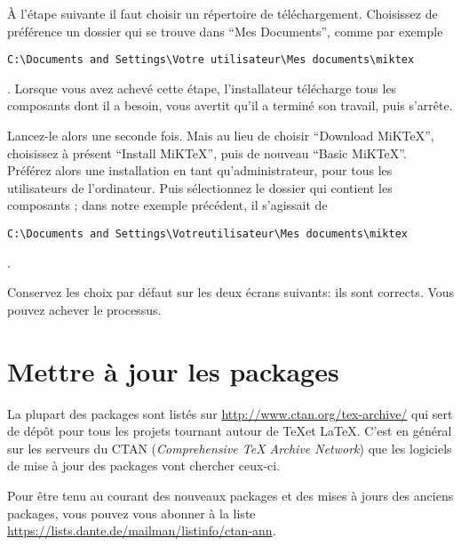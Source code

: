 À l'étape suivante il faut choisir un répertoire de téléchargement. Choisissez de préférence un dossier qui se trouve dans \enquote{Mes Documents}, comme par exemple \begin{english}\verb|C:\Documents and Settings\Votre utilisateur\Mes documents\miktex|\end{english}. Lorsque vous avez achevé cette étape, l'installateur télécharge tous les composants dont il a besoin, vous avertit qu'il a terminé son travail, puis s'arrête.

Lancez-le alors une seconde fois. Mais au lieu de choisir \enquote{Download MiKTeX}, choisissez à présent \enquote{Install MiKTeX}, puis de nouveau \enquote{Basic MiKTeX}. Préférez alors une installation en tant qu'administrateur, pour tous les utilisateurs de l'ordinateur. Puis sélectionnez le dossier qui contient les composants ; dans notre exemple précédent, il s'agissait de \begin{english}\verb|C:\Documents and Settings\Votreutilisateur\Mes documents\miktex|\end{english}.

Conservez les choix par défaut sur les deux écrans suivants: ils sont corrects. Vous pouvez achever le processus.







\section{Mettre à jour les packages}\label{maj}

La plupart des packages sont listés sur  \url{http://www.ctan.org/tex-archive/} qui sert de dépôt pour tous les projets tournant autour de \TeX et \LaTeX. C'est  en général sur les serveurs du CTAN (\textenglish{\emph{Comprehensive TeX Archive Network}}) que les logiciels de mise à jour des packages vont chercher  ceux-ci.

\begin{plusloins}
	Pour être tenu au courant des nouveaux packages et des mises à jours des anciens packages, vous pouvez vous abonner à la liste \url{https://lists.dante.de/mailman/listinfo/ctan-ann}. 
\end{plusloins}

